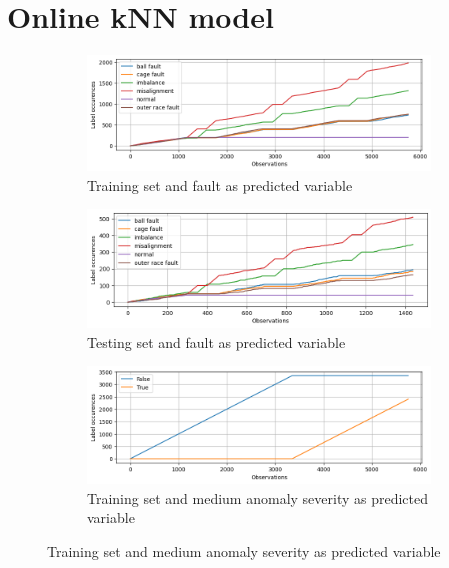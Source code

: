 

\section{Online kNN model}

\begin{figure}[ht]
    \centering
    \begin{subfigure}[b]{0.49\textwidth}
        \includegraphics[width=\textwidth]{assets/design/Online-event-ordering-fault-train.png}
        \caption{Training set and fault as predicted variable}
    \end{subfigure}
    \hfill
    \begin{subfigure}[b]{0.49\textwidth}
        \includegraphics[width=\textwidth]{assets/design/Online-event-ordering-fault-test.png}
        \caption{Testing set and fault as predicted variable}
    \end{subfigure}
    \begin{subfigure}[b]{0.49\textwidth}
        \includegraphics[width=\textwidth]{assets/design/Online-event-ordering-anomaly60-train.png}
        \caption{Training set and medium anomaly severity as predicted variable}

\end{subfigure}
\end{figure}
